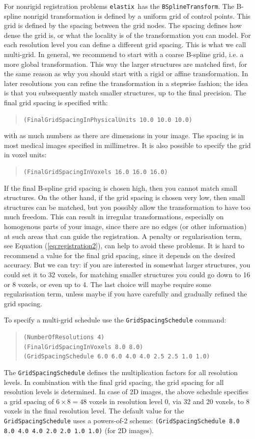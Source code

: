 \documentclass[]{report}
\newcommand{\elastix}{\texttt{elastix}}
\begin{document}
For nonrigid registration problems \elastix\ has the
\texttt{BSplineTransform}. The B-spline nonrigid transformation is
defined by a uniform grid of control points. This grid is defined
by the spacing between the grid nodes. The spacing defines how
dense the grid is, or what the locality is of the transformation
you can model. For each resolution level you can define a
different grid spacing. This is what we call multi-grid. In
general, we recommend to start with a coarse B-spline grid, i.e. a
more global transformation. This way the larger structures are
matched first, for the same reason as why you should start with a
rigid or affine transformation. In later resolutions you can
refine the transformation in a stepwise fashion; the idea is that
you subsequently match smaller structures, up to the final
precision. The final grid spacing is specified with:
\begin{quote}
\texttt{(FinalGridSpacingInPhysicalUnits 10.0 10.0 10.0)}
\end{quote}
with as much numbers as there are dimensions in your image. The
spacing is in most medical images specified in millimetres. It is
also possible to specify the grid in voxel units:
\begin{quote}
\texttt{(FinalGridSpacingInVoxels 16.0 16.0 16.0)}
\end{quote}
If the final B-spline grid spacing is chosen high, then you cannot
match small structures. On the other hand, if the grid spacing is
chosen very low, then small structures can be matched, but you
possibly allow the transformation to have too much freedom. This can
result in irregular transformations, especially on homogenous parts
of your image, since there are no edges (or other information) at
such areas that can guide the registration. A penalty or
regularisation term, see Equation (\ref{eq:registration2}), can help
to avoid these problems. It is hard to recommend a value for the
final grid spacing, since it depends on the desired accuracy. But we
can try: if you are interested in somewhat larger structures, you
could set it to 32 voxels, for matching smaller structures you could
go down to 16 or 8 voxels, or even up to 4. The last choice will
maybe require some regularisation term, unless maybe if you have
carefully and gradually refined the grid spacing.

To specify a multi-grid schedule use the \texttt{GridSpacingSchedule}
command:
\begin{quote}
\texttt{(NumberOfResolutions 4)} \\
\texttt{(FinalGridSpacingInVoxels 8.0 8.0)} \\
\texttt{(GridSpacingSchedule 6.0 6.0 4.0 4.0 2.5 2.5 1.0 1.0)}
\end{quote}
The \texttt{GridSpacingSchedule} defines the multiplication
factors for all resolution levels. In combination with the final
grid spacing, the grid spacing for all resolution levels is
determined. In case of 2D images, the above schedule specifies a
grid spacing of $6 \times 8 = 48$ voxels in resolution level 0,
via 32 and 20 voxels, to 8 voxels in the final resolution level.
The default value for the \texttt{GridSpacingSchedule} uses a
powers-of-2 scheme: \texttt{(GridSpacingSchedule 8.0 8.0 4.0 4.0
2.0 2.0 1.0 1.0)} (for 2D images).
\end{document}
